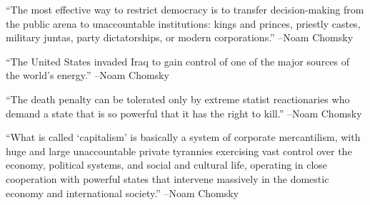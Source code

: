 \documentclass{article}%
\begin{document}
\linebreak%
\vspace{1mm}%
\begin{minipage}{\textwidth}%
\flushleft%
“The most effective way to restrict democracy is to transfer decision{-}making from the public arena to unaccountable institutions: kings and princes, priestly castes, military juntas, party dictatorships, or modern corporations.”%
\linebreak%
\vspace{1mm}%
–Noam Chomsky%
\linebreak%
\vspace{1mm}%
\end{minipage}%
\linebreak%
\vspace{1mm}%
\begin{minipage}{\textwidth}%
\flushleft%
“The United States invaded Iraq to gain control of one of the major sources of the world's energy.”%
\linebreak%
\vspace{1mm}%
–Noam Chomsky%
\linebreak%
\vspace{1mm}%
\end{minipage}%
\linebreak%
\vspace{1mm}%
\begin{minipage}{\textwidth}%
\flushleft%
“The death penalty can be tolerated only by extreme statist reactionaries who demand a state that is so powerful that it has the right to kill.”%
\linebreak%
\vspace{1mm}%
–Noam Chomsky%
\linebreak%
\vspace{1mm}%
\end{minipage}%
\linebreak%
\vspace{1mm}%
\begin{minipage}{\textwidth}%
\flushleft%
“What is called ‘capitalism’ is basically a system of corporate mercantilism, with huge and large unaccountable private tyrannies exercising vast control over the economy, political systems, and social and cultural life, operating in close cooperation with powerful states that intervene massively in the domestic economy and international society.”%
\linebreak%
\vspace{1mm}%
–Noam Chomsky%
\linebreak%
\vspace{1mm}%
\end{minipage}%
\end{document}
